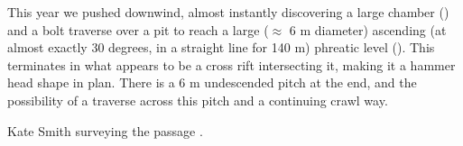 This year we pushed downwind, almost instantly discovering a large
chamber () and a bolt traverse over a pit to reach a
large ($\approx$ 6 m diameter) ascending (at almost exactly 30
degrees, in a straight line for 140 m) phreatic level (). This terminates in what appears to be a cross rift intersecting
it, making it a hammer head shape in plan. There is a 6 m undescended
pitch at the end, and the possibility of a traverse across this pitch
and a continuing crawl way.

\begin{marginfigure}
\checkoddpage \ifoddpage \forcerectofloat \else \forceversofloat \fi
\centering
 \caption{Kate Smith surveying the passage \protect{}. }
 \label{amazing grace survey}
\end{marginfigure}

